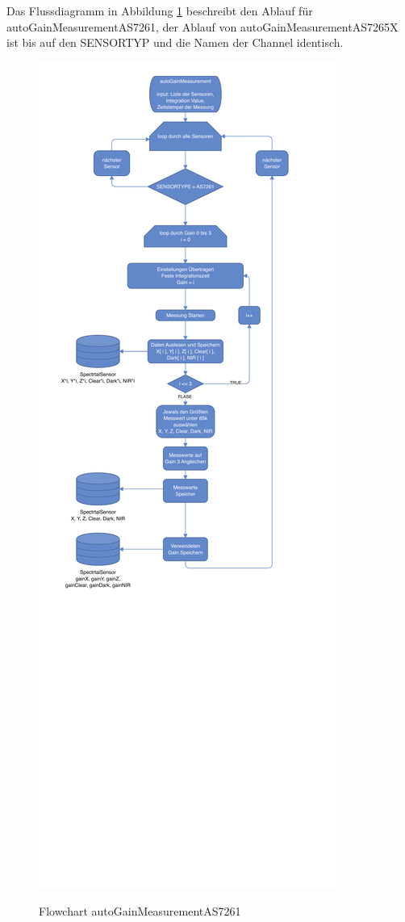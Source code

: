 \noindent Das Flussdiagramm in Abbildung \ref{fig:autoGainMeasurement} beschreibt den Ablauf für autoGainMeasurementAS7261,
der Ablauf von autoGainMeasurementAS7265X ist bis auf den SENSORTYP und die Namen der Channel identisch.
\begin{figure}[H]
  \centering
    \caption{Flowchart autoGainMeasurementAS7261}
 \includegraphics[width=0.83\linewidth]{img/autoGainMeasurement}
  \label{fig:autoGainMeasurement}
\end{figure}

